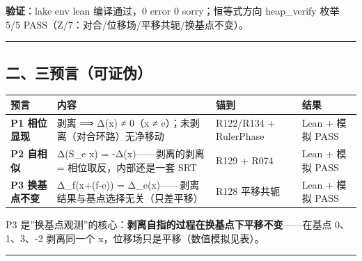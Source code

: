 \documentclass[
]{article}
\newcounter{none} %
\begin{document}
\textbf{验证}：lake env lean 编译通过，0 error 0 sorry；恒等式方向
heap\_verify 枚举 5/5 PASS（Z/7：对合/位移场/平移共轭/换基点不变）。

\begin{center}\rule{0.5\linewidth}{0.5pt}\end{center}

\subsection{二、三预言（可证伪）}\label{ux4e8cux4e09ux9884ux8a00ux53efux8bc1ux4f2a}

{\def\LTcaptype{none} %
\begin{longtable}[]{@{}
 >{\raggedright\arraybackslash}p{}
 >{\raggedright\arraybackslash}p{}
 >{\raggedright\arraybackslash}p{}
 >{\raggedright\arraybackslash}p{}@{}}
\toprule\noalign{}
\begin{minipage}[b]{\linewidth}\raggedright
预言
\end{minipage} & \begin{minipage}[b]{\linewidth}\raggedright
内容
\end{minipage} & \begin{minipage}[b]{\linewidth}\raggedright
锚到
\end{minipage} & \begin{minipage}[b]{\linewidth}\raggedright
结果
\end{minipage} \\
\midrule\noalign{}
\endhead
\bottomrule\noalign{}
\endlastfoot
\textbf{P1 相位显现} & 剥离 ⟹ Δ(x) ≠ 0（x ≠
e）；未剥离（对合环路）无净移动 & R122/R134 + RulerPhase & Lean + 模拟
PASS \\
\textbf{P2 自相似} & Δ(S\_e x) = -Δ(x)------剥离的剥离 =
相位取反，内部还是一套 SRT & R129 + R074 & Lean + 模拟 PASS \\
\textbf{P3 换基点不变} & Δ\_f(x+(f-e)) =
Δ\_e(x)------剥离结果与基点选择无关（只差平移） & R128 平移共轭 & Lean +
模拟 PASS \\
\end{longtable}
}

P3
是''换基点观测''的核心：\textbf{剥离自指的过程在换基点下平移不变}------在基点
0、1、3、-2 剥离同一个 x，位移场只是平移（数值模拟见表）。

\begin{center}\rule{0.5\linewidth}{0.5pt}\end{center}
\end{document}

